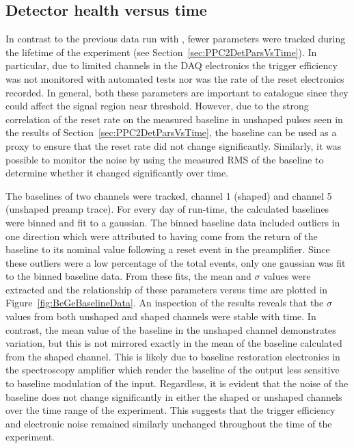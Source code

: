 		\subsection{Detector health versus time}
		\label{sec:BeGeParsVsTime}

	In contrast to the previous data run with , fewer parameters were tracked during the lifetime of the experiment (see Section~\ref{sec:PPC2DetParsVsTime}).  In particular, due to limited channels in the DAQ electronics the trigger efficiency was not monitored with automated tests nor was the rate of the reset electronics recorded.  In general, both these parameters are important to catalogue since they could affect the signal region near threshold.  However, due to the strong correlation of the reset rate on  the measured baseline in unshaped pulses seen in the results of Section~\ref{sec:PPC2DetParsVsTime}, the baseline can be used as a proxy to ensure that the reset rate did not change significantly.  Similarly, it was possible to monitor the noise by using the measured RMS of the baseline to determine whether it changed significantly over time.  
	
	The baselines of two channels were tracked, channel 1 (shaped) and channel 5 (unshaped preamp trace).  For every day of run-time, the calculated baselines were binned and fit to a gaussian.  
The binned baseline data included outliers in one direction which were attributed to having come from the return of the baseline to its nominal value following a reset event in the preamplifier.  Since these outliers were a low percentage of the total events, only one gaussian was fit to the binned baseline data.  From these fits, the mean and $\sigma$ values were extracted and the relationship of these parameters versus time are plotted in Figure~\ref{fig:BeGeBaselineData}.  An inspection of the results reveals that the $\sigma$ values from both unshaped and shaped channels were stable with time.  In contrast, the mean value of the baseline in the unshaped channel demonstrates variation, but this is not mirrored exactly in the mean of the baseline calculated from the shaped channel.  This is likely due to baseline restoration electronics in the spectroscopy amplifier which render the baseline of the output less sensitive to baseline modulation of the input.  Regardless, it is evident that the noise of the baseline does not change significantly in either the shaped or unshaped channels over the time range of the experiment.  This suggests that the trigger efficiency and electronic noise remained similarly unchanged throughout the time of the experiment.  

